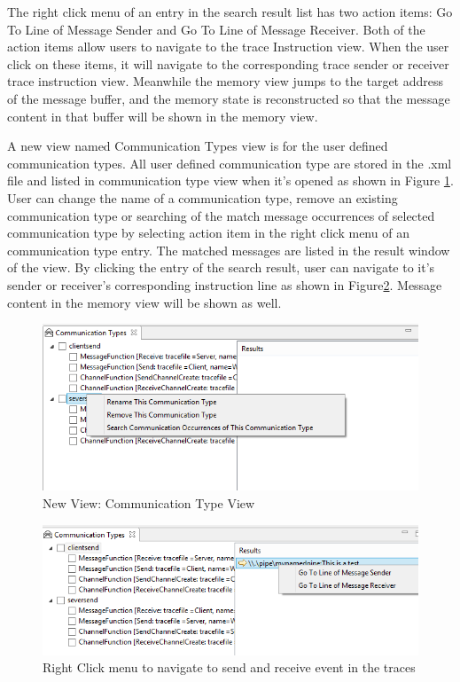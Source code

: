 The right click menu of an entry in the search result list has two action items: Go To Line of Message Sender and Go To Line of Message Receiver. Both of the action items allow users to navigate to the trace Instruction view. When the user click on these items, it will navigate to the corresponding trace sender or receiver trace instruction view.  Meanwhile the memory view jumps to the target address of the message buffer, and the memory state is reconstructed so that the message content in that buffer will be shown in the memory view.


A new view named Communication Types view is for the user defined communication types. All user defined communication type are stored in the .xml file and listed in communication type view when it's opened as shown in Figure \ref{CommunicationTypeview}. User can change the name of a communication type, remove an existing communication type or searching of the match message occurrences of selected communication type by selecting action item in the right click menu of an communication type entry. The matched messages are listed in the result window of the view. By clicking the entry of the search  result, user can navigate to it's sender or receiver's corresponding instruction line as shown in Figure\ref{searchresult}. Message content in the memory view will be shown as well.


\begin{figure}[h]
\includegraphics[scale=.9]{Figures/CommunicationTypeview}
 \caption{New View: Communication Type View}
\label{CommunicationTypeview}
\end{figure}

\begin{figure}[h]
\includegraphics[scale=.9]{Figures/searchresult}
 \caption{Right Click menu to navigate to send and receive event in the traces}
\label{searchresult}
\end{figure}


